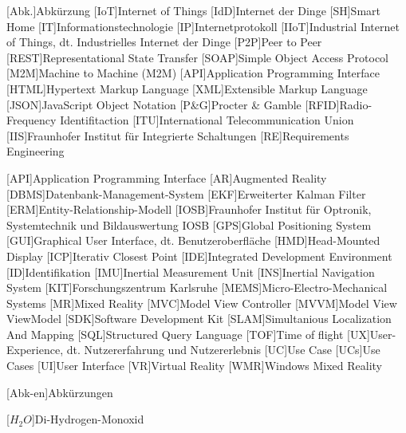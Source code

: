 \begin{acronym}[DHBW]
 [Abk.]{Abkürzung}
 [IoT]{Internet of Things}
 [IdD]{Internet der Dinge}
 [SH]{Smart Home}
 [IT]{Informationstechnologie}
 [IP]{Internetprotokoll}
 [IIoT]{Industrial Internet of Things, dt. Industrielles Internet der Dinge}
 [P2P]{Peer to Peer} 
 [REST]{Representational State Transfer}
 [SOAP]{Simple Object Access Protocol}
 [M2M]{Machine to Machine (M2M)}
 [API]{Application Programming Interface}
 [HTML]{Hypertext Markup Language}
 [XML]{Extensible Markup Language}
 [JSON]{JavaScript Object Notation}
 [P\&G]{Procter \& Gamble}
 [RFID]{Radio-Frequency Identifitaction}
 [ITU]{International Telecommunication Union}
 [IIS]{Fraunhofer Institut für Integrierte Schaltungen}
 [RE]{Requirements Engineering}



 [API]{Application Programming Interface}
 [AR]{Augmented Reality}
 [DBMS]{Datenbank-Management-System}
 [EKF]{Erweiterter Kalman Filter}
 [ERM]{Entity-Relationship-Modell}
 [IOSB]{Fraunhofer Institut für Optronik, Systemtechnik und Bildauswertung IOSB}
 [GPS]{Global Positioning System}
 [GUI]{Graphical User Interface, dt. Benutzeroberfläche}
 [HMD]{Head-Mounted Display}
 [ICP]{Iterativ Closest Point}
 [IDE]{Integrated Development Environment}
 [ID]{Identifikation}
 [IMU]{Inertial Measurement Unit}
 [INS]{Inertial Navigation System}
 [KIT]{Forschungszentrum Karlsruhe}
 [MEMS]{Micro-Electro-Mechanical Systems}
 [MR]{Mixed Reality}
 [MVC]{Model View Controller}
 [MVVM]{Model View ViewModel}
 [SDK]{Software Development Kit}
 [SLAM]{Simultanious Localization And Mapping}
 [SQL]{Structured Query Language}
 [TOF]{Time of flight}
 [UX]{User-Experience, dt. Nutzererfahrung und Nutzererlebnis}
 [UC]{Use Case}
 [UCs]{Use Cases}
 [UI]{User Interface}
 [VR]{Virtual Reality}
 [WMR]{Windows Mixed Reality}

 [Abk-en]{Abkürzungen}


 [\ensuremath{H_2O}]{Di-Hydrogen-Monoxid}

\end{acronym}
